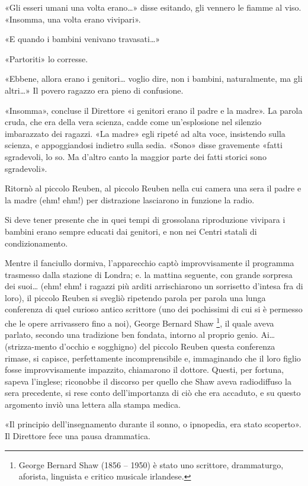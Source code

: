 \documentclass[
a5paper, %
10pt, %
twoside, 
onecolumn, %
openany, %
]{memoir}
\begin{document}
«Gli esseri umani una volta erano…» disse esitando, gli vennero le fiamme al viso. «Insomma, una volta erano vivipari».

«E quando i bambini venivano travasati…»

«Partoriti» lo corresse.

«Ebbene, allora erano i genitori… voglio dire, non i bambini, naturalmente, ma gli altri…» Il povero ragazzo era pieno di confusione.

«Insomma», concluse il Direttore «i genitori erano il padre e la madre». La parola cruda, che era della vera scienza, cadde come un’esplosione nel silenzio imbarazzato dei ragazzi. «La madre» egli ripeté ad alta voce, insistendo sulla scienza, e appoggiandosi indietro sulla sedia. «Sono» disse gravemente «fatti sgradevoli, lo so. Ma d’altro canto la maggior parte dei fatti storici sono sgradevoli».

Ritornò al piccolo Reuben, al piccolo Reuben nella cui camera una sera il padre e la madre (ehm! ehm!) per distrazione lasciarono in funzione la radio.

Si deve tener presente che in quei tempi di grossolana riproduzione vivipara i bambini erano sempre educati dai genitori, e non nei Centri statali di condizionamento.

Mentre il fanciullo dormiva, l’apparecchio captò improvvisamente il programma trasmesso dalla stazione di Londra; e. la mattina seguente, con grande sorpresa dei suoi… (ehm! ehm! i ragazzi più arditi arrischiarono un sorrisetto d’intesa fra di loro), il piccolo Reuben si svegliò ripetendo parola per parola una lunga conferenza di quel curioso antico scrittore (uno dei pochissimi di cui si è permesso che le opere arrivassero fino a noi), George Bernard Shaw \footnote{George Bernard Shaw (1856 – 1950) è stato uno scrittore, drammaturgo, aforista, linguista e critico musicale irlandese.}, il quale aveva parlato, secondo una tradizione ben fondata, intorno al proprio genio. Ai… (strizza-mento d’occhio e sogghigno) del piccolo Reuben questa conferenza rimase, si capisce, perfettamente incomprensibile e, immaginando che il loro figlio fosse improvvisamente impazzito, chiamarono il dottore. Questi, per fortuna, sapeva l’inglese; riconobbe il discorso per quello che Shaw aveva radiodiffuso la sera precedente, si rese conto dell’importanza di ciò che era accaduto, e su questo argomento inviò una lettera alla stampa medica.

«Il principio dell’insegnamento durante il sonno, o ipnopedia, era stato scoperto». Il Direttore fece una pausa drammatica.
\end{document}
